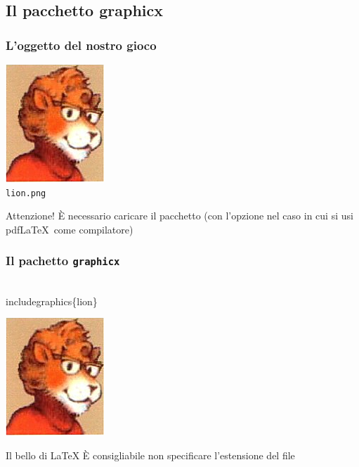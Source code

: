\documentclass[svgnames,%
	ucs,%
	pdftex]{guitbeamer}
\begin{document}
\subsection{Il pacchetto graphicx}
\begin{frame}
  \frametitle{L'oggetto del nostro gioco}
	\begin{center}
		\includegraphics[]{lion}\\
		\texttt{lion.png}
	\end{center}
	\begin{block}{Attenzione!}
		\`E necessario caricare il pacchetto  (con l'opzione  nel caso in cui si usi pdf\LaTeX\ come compilatore)
	\end{block}
\end{frame}
\begin{frame}
  \frametitle{Il pachetto \texttt{graphicx}}
	\begin{LaTeXcode}
		\\includegraphics\{lion\}
	\end{LaTeXcode}
	\begin{center}
		\includegraphics[]{lion}
	\end{center}
	\begin{block}{Il bello di \LaTeX}
		\`E consigliabile non specificare l'estensione del file 
	\end{block}
\end{frame}
\end{document}
